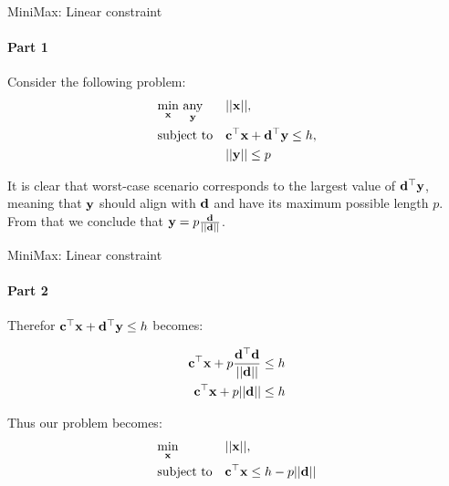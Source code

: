 \documentclass{beamer}
\begin{document}
\begin{frame}{MiniMax: Linear constraint}
\framesubtitle{Part 1}
\begin{flushleft}

Consider the following problem:
%
\begin{equation}
\begin{aligned}
& \underset{\mathbf{x}}{\text{min}} \ \underset{\mathbf{y}}{\text{any}}
& & ||\mathbf{x}||, \\
& \text{subject to}
& & \mathbf{c}^\top \mathbf{x} + \mathbf{d}^\top \mathbf{y} \leq h, \\
& & & ||\mathbf{y}|| \leq p
\end{aligned}
\end{equation}

It is clear that worst-case scenario corresponds to the largest value of $\mathbf{d}^\top \mathbf{y}$, meaning that $\mathbf{y}$ should align with $\mathbf{d}$ and have its maximum possible length $p$. From that we conclude that $\mathbf{y} =  p \frac{\mathbf{d}}{|| \mathbf{d} ||} $.
 
\end{flushleft}
\end{frame}



\begin{frame}{MiniMax: Linear constraint}
\framesubtitle{Part 2}
\begin{flushleft}

Therefor $\mathbf{c}^\top \mathbf{x} + \mathbf{d}^\top \mathbf{y} \leq h$ becomes:

\begin{align}
    \mathbf{c}^\top \mathbf{x} + p  \frac{\mathbf{d}^\top\mathbf{d}}{|| \mathbf{d} ||} \leq h \\
    \mathbf{c}^\top \mathbf{x} + p || \mathbf{d} || \leq h 
\end{align}

\bigskip

Thus our problem becomes:
%
\begin{equation}
\begin{aligned}
& \underset{\mathbf{x}}{\text{min}}
& & ||\mathbf{x}||, \\
& \text{subject to}
& & \mathbf{c}^\top \mathbf{x} \leq h - p || \mathbf{d} ||
\end{aligned}
\end{equation}
 
\end{flushleft}
\end{frame}
\end{document}
